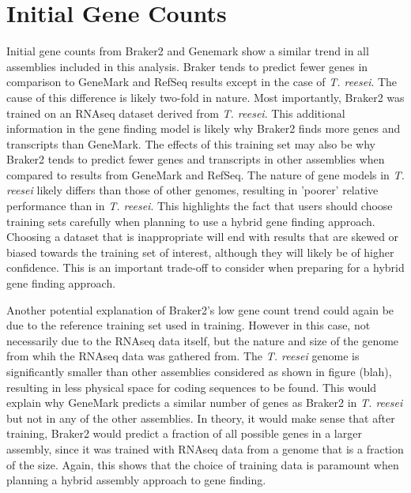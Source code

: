 \section{Initial Gene Counts}
Initial gene counts from Braker2 and Genemark show a similar trend in
all assemblies included in this analysis. Braker tends to predict
fewer genes in comparison to GeneMark and RefSeq results except in the
case of \textit{T. reesei}. The cause of this difference is likely
two-fold in nature. Most importantly, Braker2 was trained on an RNAseq
dataset derived from \textit{T. reesei}. This additional information
in the gene finding model is likely why Braker2 finds more genes and
transcripts than GeneMark. The effects of this training set may also
be why Braker2 tends to predict fewer genes and transcripts in other
assemblies when compared to results from GeneMark and RefSeq. The
nature of gene models in \textit{T. reesei} likely differs than those
of other genomes, resulting in 'poorer' relative performance than in
\textit{T. reesei}. This highlights the fact that users should choose
training sets carefully when planning to use a hybrid gene finding
approach. Choosing a dataset that is inappropriate will end with
results that are skewed or biased towards the training set of
interest, although they will likely be of higher confidence. This is
an important trade-off to consider when preparing for a hybrid gene
finding approach.

Another potential explanation of Braker2's low gene count trend could
again be due to the reference training set used in training. However
in this case, not necessarily due to the RNAseq data itself, but the
nature and size of the genome from whih the RNAseq data was gathered
from. The \textit{T. reesei} genome is significantly smaller than
other assemblies considered as shown in figure (blah), resulting in
less physical space for coding sequences to be found. This would
explain why GeneMark predicts a similar number of genes as Braker2 in
\textit{T. reesei} but not in any of the other assemblies. In theory,
it would make sense that after training, Braker2 would predict a
fraction of all possible genes in a larger assembly, since it was
trained with RNAseq data from a genome that is a fraction of the
size. Again, this shows that the choice of training data is paramount
when planning a hybrid assembly approach to gene finding.


